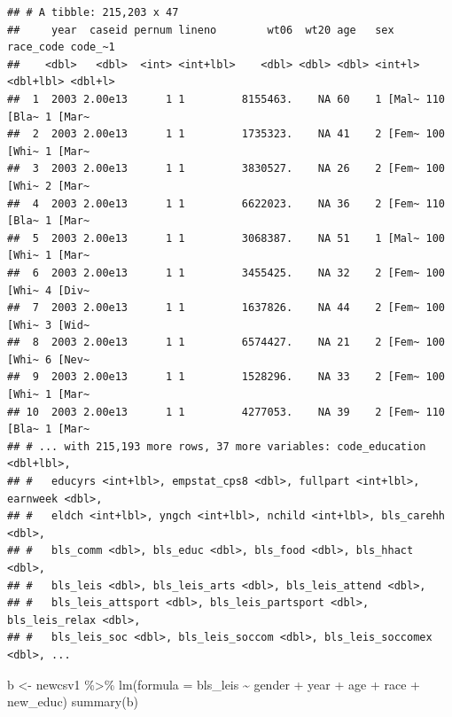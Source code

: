 \documentclass[
]{article}
\newenvironment{Shaded}{\begin{snugshade}}{\end{snugshade}}
\newcommand{\AttributeTok}[1]{\textcolor[rgb]{0.77,0.63,0.00}{#1}}
\newcommand{\FunctionTok}[1]{\textcolor[rgb]{0.00,0.00,0.00}{#1}}
\newcommand{\NormalTok}[1]{#1}
\newcommand{\OtherTok}[1]{\textcolor[rgb]{0.56,0.35,0.01}{#1}}
\newcommand{\SpecialCharTok}[1]{\textcolor[rgb]{0.00,0.00,0.00}{#1}}
\begin{document}
\begin{verbatim}
## # A tibble: 215,203 x 47
##     year  caseid pernum lineno        wt06  wt20 age   sex     race_code code_~1
##    <dbl>   <dbl>  <int> <int+lbl>    <dbl> <dbl> <dbl> <int+l> <dbl+lbl> <dbl+l>
##  1  2003 2.00e13      1 1         8155463.    NA 60    1 [Mal~ 110 [Bla~ 1 [Mar~
##  2  2003 2.00e13      1 1         1735323.    NA 41    2 [Fem~ 100 [Whi~ 1 [Mar~
##  3  2003 2.00e13      1 1         3830527.    NA 26    2 [Fem~ 100 [Whi~ 2 [Mar~
##  4  2003 2.00e13      1 1         6622023.    NA 36    2 [Fem~ 110 [Bla~ 1 [Mar~
##  5  2003 2.00e13      1 1         3068387.    NA 51    1 [Mal~ 100 [Whi~ 1 [Mar~
##  6  2003 2.00e13      1 1         3455425.    NA 32    2 [Fem~ 100 [Whi~ 4 [Div~
##  7  2003 2.00e13      1 1         1637826.    NA 44    2 [Fem~ 100 [Whi~ 3 [Wid~
##  8  2003 2.00e13      1 1         6574427.    NA 21    2 [Fem~ 100 [Whi~ 6 [Nev~
##  9  2003 2.00e13      1 1         1528296.    NA 33    2 [Fem~ 100 [Whi~ 1 [Mar~
## 10  2003 2.00e13      1 1         4277053.    NA 39    2 [Fem~ 110 [Bla~ 1 [Mar~
## # ... with 215,193 more rows, 37 more variables: code_education <dbl+lbl>,
## #   educyrs <int+lbl>, empstat_cps8 <dbl>, fullpart <int+lbl>, earnweek <dbl>,
## #   eldch <int+lbl>, yngch <int+lbl>, nchild <int+lbl>, bls_carehh <dbl>,
## #   bls_comm <dbl>, bls_educ <dbl>, bls_food <dbl>, bls_hhact <dbl>,
## #   bls_leis <dbl>, bls_leis_arts <dbl>, bls_leis_attend <dbl>,
## #   bls_leis_attsport <dbl>, bls_leis_partsport <dbl>, bls_leis_relax <dbl>,
## #   bls_leis_soc <dbl>, bls_leis_soccom <dbl>, bls_leis_soccomex <dbl>, ...
\end{verbatim}

\begin{Shaded}
\begin{Highlighting}[]
\NormalTok{b }\OtherTok{\textless{}{-}}\NormalTok{ newcsv1 }\SpecialCharTok{\%\textgreater{}\%}
  \FunctionTok{lm}\NormalTok{(}\AttributeTok{formula =}\NormalTok{ bls\_leis }\SpecialCharTok{\textasciitilde{}}\NormalTok{ gender }\SpecialCharTok{+}\NormalTok{ year }\SpecialCharTok{+}\NormalTok{ age }\SpecialCharTok{+}\NormalTok{ race }\SpecialCharTok{+}\NormalTok{ new\_educ) }
\FunctionTok{summary}\NormalTok{(b)}
\end{Highlighting}
\end{Shaded}
\end{document}
